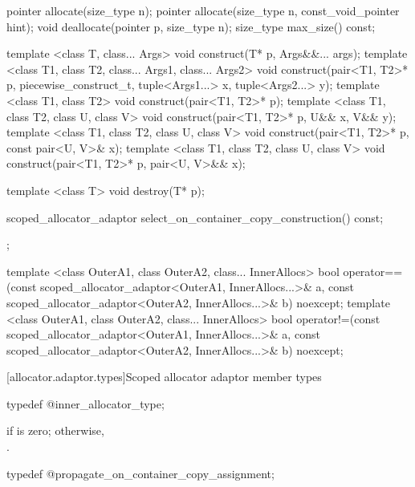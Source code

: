 \begin{codeblock}
{{    pointer allocate(size_type n);
    pointer allocate(size_type n, const_void_pointer hint);
    void deallocate(pointer p, size_type n);
    size_type max_size() const;

    template <class T, class... Args>
      void construct(T* p, Args&&... args);
    template <class T1, class T2, class... Args1, class... Args2>
      void construct(pair<T1, T2>* p, piecewise_construct_t,
                     tuple<Args1...> x, tuple<Args2...> y);
    template <class T1, class T2>
      void construct(pair<T1, T2>* p);
    template <class T1, class T2, class U, class V>
      void construct(pair<T1, T2>* p, U&& x, V&& y);
    template <class T1, class T2, class U, class V>
      void construct(pair<T1, T2>* p, const pair<U, V>& x);
    template <class T1, class T2, class U, class V>
      void construct(pair<T1, T2>* p, pair<U, V>&& x);

    template <class T>
      void destroy(T* p);

    scoped_allocator_adaptor select_on_container_copy_construction() const;
  };

  template <class OuterA1, class OuterA2, class... InnerAllocs>
    bool operator==(const scoped_allocator_adaptor<OuterA1, InnerAllocs...>& a,
                    const scoped_allocator_adaptor<OuterA2, InnerAllocs...>& b) noexcept;
  template <class OuterA1, class OuterA2, class... InnerAllocs>
    bool operator!=(const scoped_allocator_adaptor<OuterA1, InnerAllocs...>& a,
                    const scoped_allocator_adaptor<OuterA2, InnerAllocs...>& b) noexcept;
}
\end{codeblock}

[allocator.adaptor.types]{Scoped allocator adaptor member types}

%
%
\begin{itemdecl}
typedef @\seebelow@ inner_allocator_type;
\end{itemdecl}

\begin{itemdescr}
\pnum
\ctype {} if  is
zero; otherwise,\\ .
\end{itemdescr}

%
%
\begin{itemdecl}
typedef @\seebelow@ propagate_on_container_copy_assignment;
\end{itemdecl}

